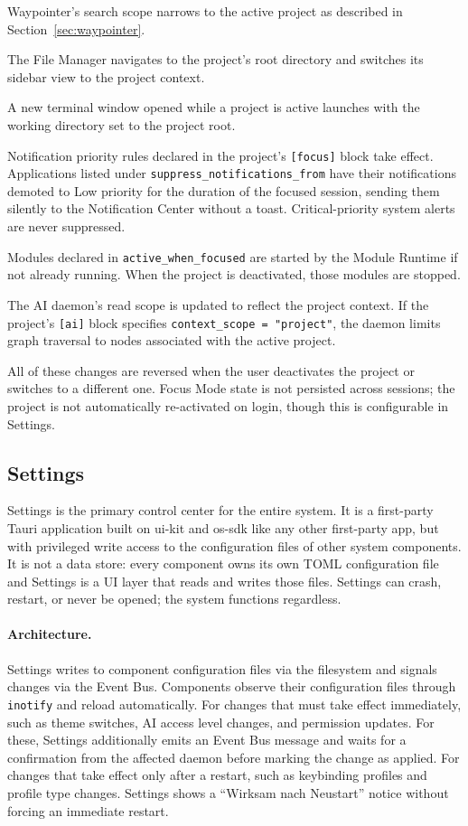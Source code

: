 Waypointer's search scope narrows to the active project as described in
Section~\ref{sec:waypointer}.

The File Manager navigates to the project's root directory and switches its
sidebar view to the project context.

A new terminal window opened while a project is active launches with the
working directory set to the project root.

Notification priority rules declared in the project's \texttt{[focus]} block
take effect. Applications listed under \texttt{suppress\_notifications\_from}
have their notifications demoted to Low priority for the duration of the
focused session, sending them silently to the Notification Center without
a toast. Critical-priority system alerts are never suppressed.

Modules declared in \texttt{active\_when\_focused} are started by the Module
Runtime if not already running. When the project is deactivated, those modules
are stopped.

The AI daemon's read scope is updated to reflect the project context. If
the project's \texttt{[ai]} block specifies \texttt{context\_scope = "project"},
the daemon limits graph traversal to nodes associated with the active project.

All of these changes are reversed when the user deactivates the project or
switches to a different one. Focus Mode state is not persisted across sessions;
the project is not automatically re-activated on login, though this is
configurable in Settings.

\subsection{Settings}
\label{sec:settings}

Settings is the primary control center for the entire system. It is a
first-party Tauri application built on ui-kit and os-sdk like any other
first-party app, but with privileged write access to the configuration files
of other system components. It is not a data store: every component owns its
own TOML configuration file and Settings is a UI layer that reads and writes
those files. Settings can crash, restart, or never be opened; the system
functions regardless.

\paragraph{Architecture.}
Settings writes to component configuration files via the filesystem and signals
changes via the Event Bus. Components observe their configuration files through
\texttt{inotify} and reload automatically. For changes that must take effect
immediately, such as theme switches, AI access level changes, and permission updates.
For these, Settings additionally emits an Event Bus message and waits for a confirmation from the
affected daemon before marking the change as applied. For changes that take
effect only after a restart, such as keybinding profiles and profile type changes.
Settings shows a ``Wirksam nach Neustart'' notice without forcing an immediate
restart.

